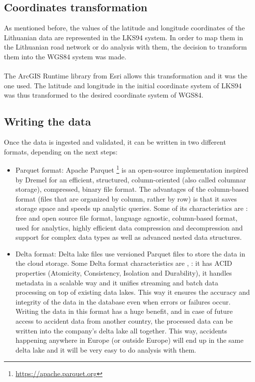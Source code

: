 \subsection{Coordinates transformation}\label{sec:coordinates}
As mentioned before, the values of the latitude and longitude coordinates of the Lithuanian data are represented in the \ac{LKS94} system. In order to map them in the Lithuanian road network or do analysis with them, the decision to transform them into the \ac{WGS84} system was made. 
\\
\\
The ArcGIS Runtime library \cite{arcgis_runtime} from Esri \cite{esri} allows this transformation and it was the one used. The latitude and longitude in the initial coordinate system of \ac{LKS94} was thus transformed to the desired coordinate system of \ac{WGS84}. 


\subsection{Writing the data}
Once the data is ingested and validated, it can be written in two different formats, depending on the next steps:
\begin{itemize}
  \item Parquet format: Apache Parquet \footnote{\url{https://apache.parquet.org}} is an open-source implementation inspired by Dremel \cite{dremelPaper} for an efficient, structured, column-oriented (also called columnar storage), compressed, binary file format. The advantages of the column-based format (files that are organized by column, rather by row) is that it saves storage space and speeds up analytic queries. 
    Some of its characteristics are \cite{parquet1}: free and open source file format, language agnostic, column-based format, used for analytics, highly efficient data compression and decompression and support for complex data types as well as advanced nested data structures. 

    \item Delta format: Delta lake files use versioned Parquet files to store the data in the cloud storage.
    Some Delta format characteristics are \cite{delta1}, \cite{deltaPaper}: it has ACID properties (Atomicity, Consistency, Isolation and Durability), it handles metadata in a scalable way and it unifies streaming and batch data processing on top of existing data lakes. This way it ensures the accuracy and integrity of the data in the database even when errors or failures occur. 
    Writing the data in this format has a huge benefit, and in case of future access to accident data from another country, the processed data can be written into the company's delta lake all together. This way, accidents happening anywhere in Europe (or outside Europe) will end up in the same delta lake and it will be very easy to do analysis with them.

\end{itemize}


